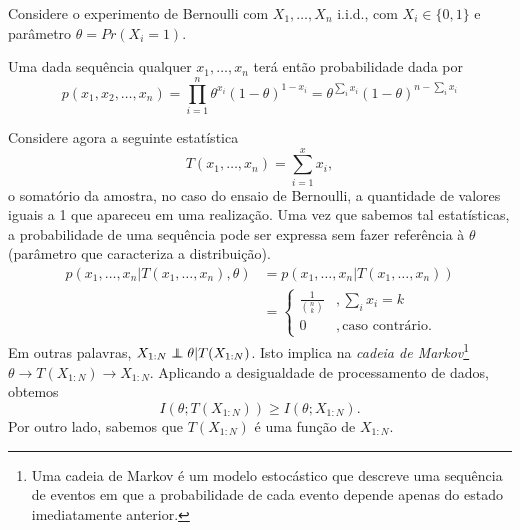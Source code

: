 \begin{example}\label{ex:ensaiobernoulliT}
  Considere o experimento de Bernoulli com $X_1, \ldots, X_n$ i.i.d., com $X_i \in \{0, 1\}$ e
  parâmetro $\theta = Pr(X_i = 1)$.

  Uma dada sequência qualquer $x_1, \ldots, x_n$ terá então probabilidade dada por
  \begin{equation}
  p(x_1,x_2,\ldots,x_n) = \prod_{i=1}^n \theta^{x_i} (1-\theta)^{1-x_i} = \theta^{\sum_i x_i} (1-\theta)^{n - \sum_i x_i}
  \end{equation}

  Considere agora a seguinte estatística
  \begin{equation}
    T(x_1,\ldots, x_n) = \sum_{i=1}^{x} x_i ,
  \end{equation}
  o somatório da amostra, no caso do ensaio de Bernoulli, a quantidade de valores iguais a 1 que apareceu em uma realização.
  Uma vez que sabemos tal estatísticas, a probabilidade de uma sequência pode ser expressa
  sem fazer referência à $\theta$ (parâmetro que caracteriza a distribuição).
  \begin{subequations}\label{eq:TsuficienteSum}
    \begin{align}
      p(x_1,\ldots,x_n|T(x_1,\ldots,x_n),\theta) &= p(x_1,\ldots,x_n|T(x_1,\ldots,x_n)) \\
                                                &= \begin{cases}
                                                   \frac{1}{{n \choose k}} & , \sum_i x_i = k \\
                                                   0       & , \text{caso contrário}.
                                                   \end{cases}
    \end{align}
  \end{subequations}
  Em outras palavras, $X_{1:N} \independent \theta | T(X_{1:N})$. 
  Isto implica na \emph{cadeia de Markov}\footnote{Uma cadeia de Markov é um modelo estocástico
  que descreve uma sequência de eventos em que a probabilidade de cada evento depende apenas
  do estado imediatamente anterior.} $\theta \rightarrow T(X_{1:N}) \rightarrow X_{1:N}$.
  Aplicando a desigualdade de processamento de dados, obtemos
  \begin{equation}\label{eq:dpdtberex01}
    I(\theta;T(X_{1:N})) \geq I(\theta;X_{1:N}).
  \end{equation}
  Por outro lado, sabemos que $T(X_{1:N})$ é uma função de $X_{1:N}$.

\end{example}
